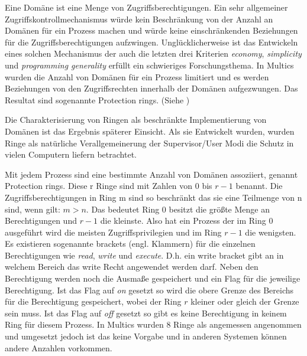 \documentclass[11pt,technote]{IEEEtran}
\begin{document}
        Eine Dom\"ane ist eine Menge von Zugriffsberechtigungen. Ein sehr allgemeiner Zugriffskontrollmechanismus w\"urde kein Beschr\"ankung von der Anzahl an
        Dom\"anen f\"ur ein Prozess machen und w\"urde keine einschr\"ankenden Beziehungen f\"ur die Zugriffsberechtigungen aufzwingen.
        Ungl\"ucklicherweise ist das Entwickeln eines solchen Mechanismus der auch die letzten drei Kriterien \textit{economy}, \textit{simplicity} und \textit{programming generality}
        erf\"ullt ein schwieriges Forschungsthema.  In Multics wurden die Anzahl von Dom\"anen f\"ur ein Prozess limitiert und es werden Beziehungen von den Zugriffsrechten innerhalb
        der Dom\"anen aufgezwungen. Das Resultat sind sogenannte Protection rings. (Siehe \cite[S. 160]{inproc:protec-rings}) 
        
        Die Charakterisierung von Ringen als beschr\"ankte Implementierung von Dom\"anen ist das Ergebnis sp\"aterer Einsicht. 
        Als sie Entwickelt wurden, wurden Ringe als nat\"urliche Verallgemeinerung der Supervisor/User Modi die Schutz in vielen Computern liefern betrachtet.
    
        Mit jedem Prozess sind eine bestimmte Anzahl von Dom\"anen assoziiert, genannt Protection rings. Diese r Ringe sind mit Zahlen von $0$ bis $r - 1$ benannt.
        Die Zugriffsberechtigungen in Ring m sind so beschr\"ankt das sie eine Teilmenge von n sind, wenn gilt: $m > n$. Das bedeutet
        Ring $0$ besitzt die gr\"o\ss te Menge an Berechtigungen und $r-1$ die kleinste. Also hat ein Prozess der im Ring $0$ ausgef\"uhrt wird
        die meisten Zugriffsprivilegien und im Ring $r-1$ die wenigsten. Es existieren sogenannte brackets (engl. Klammern) f\"ur die einzelnen Berechtigungen
        wie \textit{read}, \textit{write} und \textit{execute}. D.h. ein write bracket gibt an in welchem Bereich das write Recht angewendet werden darf. Neben den 
        Berechtigung werden noch die Ausma\ss e gespeichert und ein Flag f\"ur die jeweilige Berechtigung. Ist das Flag auf \textit{on} gesetzt 
        so wird die obere Grenze des Bereichs f\"ur die Berechtigung gespeichert, wobei der Ring $r$ kleiner oder gleich der Grenze sein muss.
        Ist das Flag auf \textit{off} gesetzt so gibt es keine Berechtigung in keinem Ring f\"ur diesem Prozess. In Multics wurden 8 Ringe als angemessen 
        angenommen und umgesetzt jedoch ist das keine Vorgabe und in anderen Systemen k\"onnen andere Anzahlen vorkommen.
    
\end{document}
